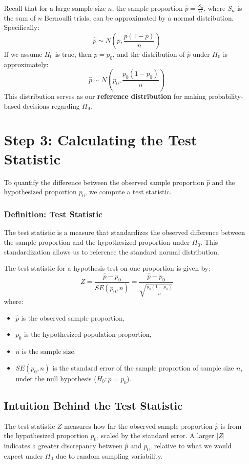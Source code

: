 \documentclass[11pt]{article}
\begin{document}
Recall that for a large sample size \( n \), the sample proportion \( \hat{p} = \frac{S_n}{n} \), where \( S_n \) is the sum of \( n \) Bernoulli trials, can be approximated by a normal distribution. Specifically:
\[
\hat{p} \sim N\left(p, \frac{p(1-p)}{n}\right)
\]
If we assume \( H_0 \) is true, then \( p = p_0 \), and the distribution of \( \hat{p} \) under \( H_0 \) is approximately:
\[
\hat{p} \sim N\left(p_0, \frac{p_0(1-p_0)}{n}\right)
\]
This distribution serves as our \textbf{reference distribution} for making probability-based decisions regarding \( H_0 \).

\section*{Step 3: Calculating the Test Statistic}

To quantify the difference between the observed sample proportion \( \hat{p} \) and the hypothesized proportion \( p_0 \), we compute a test statistic.

\subsubsection*{Definition: Test Statistic}
The test statistic is a measure that standardizes the observed difference between the sample proportion and the hypothesized proportion under \( H_0 \). This standardization allows us to reference the standard normal distribution.

The test statistic for a hypothesis test on one proportion is given by:
\[
Z = \frac{\hat{p} - p_0}{SE(p_0, n)} = \frac{\hat{p} - p_0}{\sqrt{\frac{p_0(1-p_0)}{n}}}
\]
where:
\begin{itemize}
    \item \( \hat{p} \) is the observed sample proportion,
    \item \( p_0 \) is the hypothesized population proportion,
    \item \( n \) is the sample size.
    \item $SE(p_0, n)$ is the standard error of the sample proportion of sample size $n$, under the null hypothesis ($H_0: p=p_0$).
\end{itemize}


\subsection*{Intuition Behind the Test Statistic}

The test statistic \( Z \) measures how far the observed sample proportion \( \hat{p} \) is from the hypothesized proportion \( p_0 \), scaled by the standard error. A larger \( |Z| \) indicates a greater discrepancy between \( \hat{p} \) and \( p_0 \), relative to what we would expect under \( H_0 \) due to random sampling variability.
\end{document}
